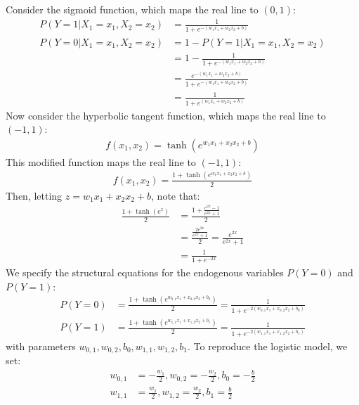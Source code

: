 \documentclass{article}
\begin{document}
\clearpage
\problem{}
\begin{center}
\end{center}
Consider the sigmoid function, which maps the real line to $(0, 1)$:
\begin{align*}
    P(Y = 1 | X_1 = x_1, X_2 = x_2) & = \frac{1}{1 + e^{-(w_1x_1 + w_2x_2 + b)}} \\
    P(Y = 0 | X_1 = x_1, X_2 = x_2) & = 1 - P(Y = 1 | X_1 = x_1, X_2 = x_2) \\
    & = 1 - \frac{1}{1 + e^{-(w_1x_1 + w_2x_2 + b)}} \\
    & = \frac{e^{-(w_1x_1 + w_2x_2 + b)}}{1 + e^{-(w_1x_1 + w_2x_2 + b)}} \\
    & = \frac{1}{1 + e^{(w_1x_1 + w_2x_2 + b)}}
\end{align*}
Now consider the hyperbolic tangent function, which maps the real line to $(-1, 1)$:
\begin{align*}
    f(x_1, x_2) = \tanh(e^{w_1x_1 + x_2x_2 + b})
\end{align*}
This modified function maps the real line to $(-1, 1)$:
\begin{align*}
    f(x_1, x_2) = \frac{1 + \tanh(e^{w_1x_1 + x_2x_2 + b})}{2}
\end{align*}
Then, letting $z = w_1x_1 + x_2x_2 + b$, note that:
\begin{align*}
    \frac{1 + \tanh(e^{z})}{2} & = \frac{1 + \frac{e^{2x} - 1}{e^{2x} + 1}}{2} \\
    & = \frac{\frac{2e^{2x}}{e^{2x} + 1}}{2} = \frac{e^{2x}}{e^{2x} + 1} \\
    & = \frac{1}{1 + e^{-2x}}
\end{align*}
We specify the structural equations for the endogenous variables $P(Y = 0)$ and $P(Y = 1)$:
\begin{align*}
    P(Y = 0) & = \frac{1 + \tanh(e^{w_{0,1}x_1 + x_{0,2}x_2 + b_0})}{2} = \frac{1}{1 + e^{-2(w_{0,1}x_1 + x_{0,2}x_2 + b_0)}} \\
    P(Y = 1) & = \frac{1 + \tanh(e^{w_{1,1}x_1 + x_{1,2}x_2 + b_1})}{2} = \frac{1}{1 + e^{-2(w_{1,1}x_1 + x_{1,2}x_2 + b_1)}}
\end{align*}
with parameters $w_{0,1}, w_{0,2}, b_0, w_{1,1}, w_{1,2}, b_1$. To reproduce the logistic model, we set:
\begin{align*}
    w_{0,1} & = -\frac{w_1}{2}, w_{0,2} = -\frac{w_2}{2}, b_0 = -\frac{b}{2} \\
    w_{1,1} & = \frac{w_1}{2}, w_{1,2} = \frac{w_2}{2}, b_1 = \frac{b}{2} \\
\end{align*}
\end{document}
